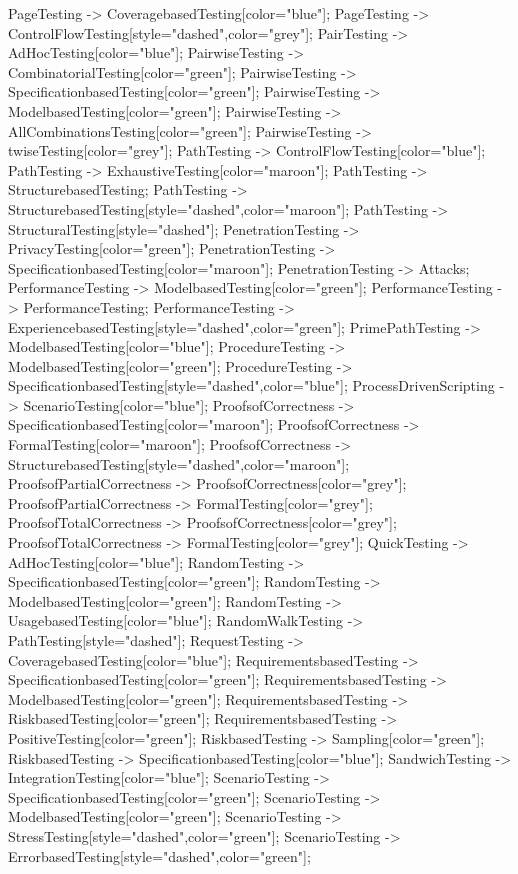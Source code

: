 \documentclass{article}
\begin{document}
{PageTesting -> CoveragebasedTesting[color="blue"];
PageTesting -> ControlFlowTesting[style="dashed",color="grey"];
PairTesting -> AdHocTesting[color="blue"];
PairwiseTesting -> CombinatorialTesting[color="green"];
PairwiseTesting -> SpecificationbasedTesting[color="green"];
PairwiseTesting -> ModelbasedTesting[color="green"];
PairwiseTesting -> AllCombinationsTesting[color="green"];
PairwiseTesting -> twiseTesting[color="grey"];
PathTesting -> ControlFlowTesting[color="blue"];
PathTesting -> ExhaustiveTesting[color="maroon"];
PathTesting -> StructurebasedTesting;
PathTesting -> StructurebasedTesting[style="dashed",color="maroon"];
PathTesting -> StructuralTesting[style="dashed"];
PenetrationTesting -> PrivacyTesting[color="green"];
PenetrationTesting -> SpecificationbasedTesting[color="maroon"];
PenetrationTesting -> Attacks;
PerformanceTesting -> ModelbasedTesting[color="green"];
PerformanceTesting -> PerformanceTesting;
PerformanceTesting -> ExperiencebasedTesting[style="dashed",color="green"];
PrimePathTesting -> ModelbasedTesting[color="blue"];
ProcedureTesting -> ModelbasedTesting[color="green"];
ProcedureTesting -> SpecificationbasedTesting[style="dashed",color="blue"];
ProcessDrivenScripting -> ScenarioTesting[color="blue"];
ProofsofCorrectness -> SpecificationbasedTesting[color="maroon"];
ProofsofCorrectness -> FormalTesting[color="maroon"];
ProofsofCorrectness -> StructurebasedTesting[style="dashed",color="maroon"];
ProofsofPartialCorrectness -> ProofsofCorrectness[color="grey"];
ProofsofPartialCorrectness -> FormalTesting[color="grey"];
ProofsofTotalCorrectness -> ProofsofCorrectness[color="grey"];
ProofsofTotalCorrectness -> FormalTesting[color="grey"];
QuickTesting -> AdHocTesting[color="blue"];
RandomTesting -> SpecificationbasedTesting[color="green"];
RandomTesting -> ModelbasedTesting[color="green"];
RandomTesting -> UsagebasedTesting[color="blue"];
RandomWalkTesting -> PathTesting[style="dashed"];
RequestTesting -> CoveragebasedTesting[color="blue"];
RequirementsbasedTesting -> SpecificationbasedTesting[color="green"];
RequirementsbasedTesting -> ModelbasedTesting[color="green"];
RequirementsbasedTesting -> RiskbasedTesting[color="green"];
RequirementsbasedTesting -> PositiveTesting[color="green"];
RiskbasedTesting -> Sampling[color="green"];
RiskbasedTesting -> SpecificationbasedTesting[color="blue"];
SandwichTesting -> IntegrationTesting[color="blue"];
ScenarioTesting -> SpecificationbasedTesting[color="green"];
ScenarioTesting -> ModelbasedTesting[color="green"];
ScenarioTesting -> StressTesting[style="dashed",color="green"];
ScenarioTesting -> ErrorbasedTesting[style="dashed",color="green"];
}
\end{document}
